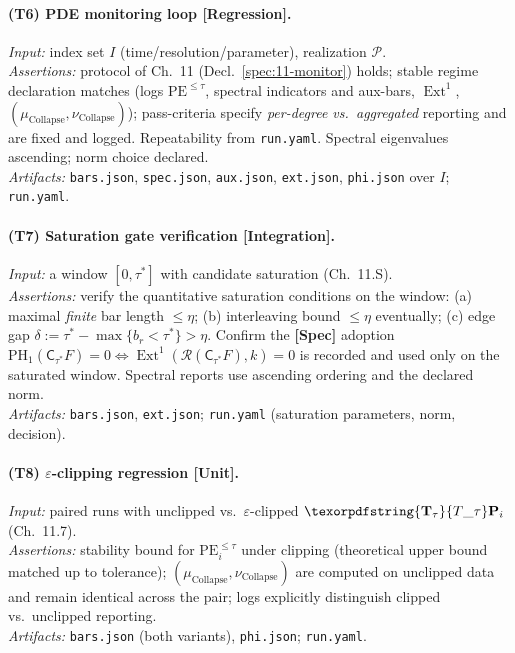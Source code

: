 \documentclass[11pt]{article}
\DeclareMathOperator{\Ext}{Ext}
\DeclareRobustCommand{\hyp}{\nobreakdash-}
\newcommand{\C}{\mathsf{C}}
\newcommand{\Rfun}{\mathcal{R}}
\numberwithin{equation}{section}
\theoremstyle{definition}
\DeclareRobustCommand{\Ttau}{\texorpdfstring{\ensuremath{\mathbf{T}_{\tau}}}{T\_\tau}}
\DeclareRobustCommand{\muc}{\mu_{\mathrm{Collapse}}}
\DeclareRobustCommand{\nuc}{\nu_{\mathrm{Collapse}}}
\providecommand{\n}{\unskip\space}
\begin{document}
\paragraph{(T6) PDE monitoring loop [Regression].}
\emph{Input:} index set \(I\) (time/resolution/parameter), realization \(\mathcal{P}\).\\\n\emph{Assertions:} protocol of Ch.~11 (Decl.~\ref{spec:11-monitor}) holds; stable regime declaration matches (logs \(\mathrm{PE}^{\le\tau}\), spectral indicators and aux-bars, \(\Ext^1\), \((\muc,\nuc)\)); pass\hyp criteria specify \emph{per\hyp degree vs.\ aggregated} reporting and are fixed and logged. Repeatability from \texttt{run.yaml}. Spectral eigenvalues ascending; norm choice declared.\\\n\emph{Artifacts:} \texttt{bars.json}, \texttt{spec.json}, \texttt{aux.json}, \texttt{ext.json}, \texttt{phi.json} over \(I\); \texttt{run.yaml}.

\paragraph{(T7) Saturation gate verification [Integration].}
\emph{Input:} a window \([0,\tau^\ast]\) with candidate saturation (Ch.~11.S).\\\n\emph{Assertions:} verify the quantitative saturation conditions on the window: (a) maximal \emph{finite} bar length \(\le \eta\); (b) interleaving bound \(\le \eta\) eventually; (c) edge gap \(\delta:=\tau^\ast-\max\{b_r<\tau^\ast\}>\eta\). Confirm the \textbf{[Spec]} adoption \(\mathrm{PH}_1(\C_{\tau^\ast}F)=0 \Leftrightarrow \Ext^1(\Rfun(\C_{\tau^\ast}F),k)=0\) is recorded and used only on the saturated window. Spectral reports use ascending ordering and the declared norm.\\\n\emph{Artifacts:} \texttt{bars.json}, \texttt{ext.json}; \texttt{run.yaml} (saturation parameters, norm, decision).

\paragraph{(T8) \(\varepsilon\)\hyp clipping regression [Unit].}
\emph{Input:} paired runs with unclipped vs.\ \(\varepsilon\)\hyp clipped \(\Ttau\mathbf{P}_i\) (Ch.~11.7).\\\n\emph{Assertions:} stability bound for \(\mathrm{PE}^{\le\tau}_i\) under clipping (theoretical upper bound matched up to tolerance); \((\muc,\nuc)\) are computed on unclipped data and remain identical across the pair; logs explicitly distinguish clipped vs.\ unclipped reporting.\\\n\emph{Artifacts:} \texttt{bars.json} (both variants), \texttt{phi.json}; \texttt{run.yaml}.
\end{document}
